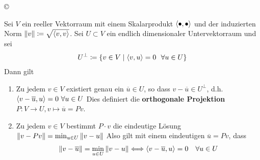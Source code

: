 \begin{image}{\copyright}
\end{image}

\begin{Satze}[Projektionssatz]
   \label{4.3.3}
  Sei $V$ ein reeller Vektorraum mit einem Skalarprodukt $\scp{\bullet}{\bullet}$
  und der induzierten Norm $\nn[v]\coloneqq \sqrt{\scp{v}{v}}$.
  Sei $U\subset V$ ein endlich dimensionaler Untervektorraum und sei
  \begin{gather*}
    U^\bot \coloneqq \left\{v\in V \mid \scp{v}{u}=0~~\forall u\in U\right\}
  \end{gather*}
  Dann gilt
  \begin{enumerate}[1)]
  \item Zu jedem $v\in V$ existiert genau ein $\overline{u}\in U$, 
    so dass $v-\overline{u}\in U^\bot$, d.h.
    $\scp{v-\overline{u}}{u} = 0 ~\forall u \in U$
    Dies definiert die \textbf{orthogonale Projektion}
    $P\colon V\to U,  v\mapsto \overline{u}= Pv$.
  \item Zu jedem $v\in V $ bestimmt $P\cdot v$ die eindeutige Lösung
    $\nn[v-Pv]= \min_{u\in U} \nn[v-u]$
    Also gilt mit einem eindeutigen $\overline{u}= Pv$, dass 
    \begin{gather}
      \nn[v-\overline{u}] = \min_{u\in U} \nn[v-u] 
      \Longleftrightarrow \scp{v-\overline{u}}{u} = 0 \quad \forall u\in U
      \label{IV.3.3}
    \end{gather}
  \end{enumerate} 	
\end{Satze}

